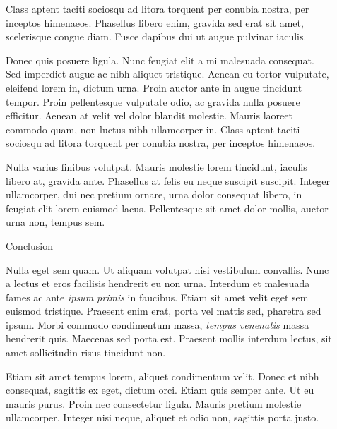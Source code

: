 \documentclass[final]{beamer}
\newlength{\sepwidth}
\newlength{\colwidth}
\newcommand{\separatorcolumn}{\begin{column}{\sepwidth}\end{column}}
\begin{document}
\begin{frame}[t]
\begin{columns}[t]
\begin{column}{\colwidth}
  

\end{column}

\separatorcolumn

\begin{column}{\colwidth}

  \begin{block}{}

    Class aptent taciti sociosqu ad litora torquent per conubia nostra, per
    inceptos himenaeos. Phasellus libero enim, gravida sed erat sit amet,
    scelerisque congue diam. Fusce dapibus dui ut augue pulvinar iaculis.


    Donec quis posuere ligula. Nunc feugiat elit a mi malesuada consequat. Sed
    imperdiet augue ac nibh aliquet tristique. Aenean eu tortor vulputate,
    eleifend lorem in, dictum urna. Proin auctor ante in augue tincidunt
    tempor. Proin pellentesque vulputate odio, ac gravida nulla posuere
    efficitur. Aenean at velit vel dolor blandit molestie. Mauris laoreet
    commodo quam, non luctus nibh ullamcorper in. Class aptent taciti sociosqu
    ad litora torquent per conubia nostra, per inceptos himenaeos.

    Nulla varius finibus volutpat. Mauris molestie lorem tincidunt, iaculis
    libero at, gravida ante. Phasellus at felis eu neque suscipit suscipit.
    Integer ullamcorper, dui nec pretium ornare, urna dolor consequat libero,
    in feugiat elit lorem euismod lacus. Pellentesque sit amet dolor mollis,
    auctor urna non, tempus sem.

  \end{block}
  
\begin{block}{Conclusion}

    Nulla eget sem quam. Ut aliquam volutpat nisi vestibulum convallis. Nunc a
    lectus et eros facilisis hendrerit eu non urna. Interdum et malesuada fames
    ac ante \textit{ipsum primis} in faucibus. Etiam sit amet velit eget sem
    euismod tristique. Praesent enim erat, porta vel mattis sed, pharetra sed
    ipsum. Morbi commodo condimentum massa, \textit{tempus venenatis} massa
    hendrerit quis. Maecenas sed porta est. Praesent mollis interdum lectus,
    sit amet sollicitudin risus tincidunt non.

    Etiam sit amet tempus lorem, aliquet condimentum velit. Donec et nibh
    consequat, sagittis ex eget, dictum orci. Etiam quis semper ante. Ut eu
    mauris purus. Proin nec consectetur ligula. Mauris pretium molestie
    ullamcorper. Integer nisi neque, aliquet et odio non, sagittis porta justo.


\end{block}
\end{column}
\end{columns}
\end{frame}
\end{document}
